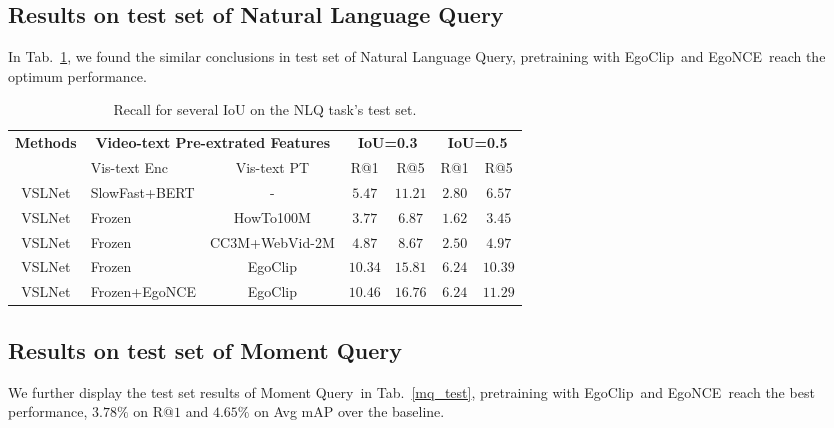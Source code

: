 \documentclass{article}
\newcommand{\dataset}{EgoClip}
\newcommand{\model}{EgoNCE\xspace}
\newcommand{\nlq}{Natural Language Query}
\newcommand{\mq}{Moment Query}
\newcommand{\ccweb}{CC3M+WebVid-2M}
\newcommand{\howto}{HowTo100M}
\begin{document}
\subsection{Results on test set of \nlq}\label{d_nlq}
In Tab.~\ref{nlq_test}, we found the similar conclusions in test set of \nlq, pretraining with \dataset~and \model~reach the optimum performance.
\begin{table}[htb]
\centering
\begin{tabular}{clc|cccc}
	\toprule
	\textbf{Methods} & \multicolumn{2}{c|}{\textbf{Video-text Pre-extrated Features}} & \multicolumn{2}{c}{\textbf{IoU=0.3}} & \multicolumn{2}{c}{\textbf{IoU=0.5}} \\
	& Vis-text Enc & Vis-text PT & R@1 & R@5 & R@1 & R@5 \\  \midrule[1pt] 
	VSLNet  &  SlowFast+BERT   & - & $5.47$ & $11.21$ & $2.80$ & $6.57$  \\  
	 \midrule
 	VSLNet  &  Frozen       & \howto        & $3.77$ & $6.87$  & $1.62$ & $3.45$ \\	
	VSLNet  &  Frozen       & \ccweb & $4.87$ & $8.67$ & $2.50$ & $4.97$ \\		
	VSLNet  &  Frozen       & \dataset      & \underline{$10.34$} & \underline{$15.81$} & \underline{$6.24$} & \underline{$10.39$}\\
	VSLNet  &  Frozen+\model& \dataset      & $\mathbf{10.46}$ & $\mathbf{16.76}$ & $\mathbf{6.24}$ & $\mathbf{11.29}$ \\	
	\bottomrule
\end{tabular}
\centering
\vspace{0.4em}
\caption{Recall for several IoU on the NLQ task's test set.}
\label{nlq_test}
\vspace{-0.5cm}
\end{table} \subsection{Results on test set of \mq}\label{d_mq}
We further display the test set results of \mq~in Tab.~\ref{mq_test}, pretraining with \dataset~and \model~reach the best performance, $3.78\%$ on R$@1$ and $4.65\%$ on Avg mAP over the baseline.
\end{document}
